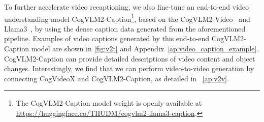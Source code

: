  
To further accelerate video recaptioning, we also fine-tune an end-to-end video understanding model CogVLM2-Caption\footnote{The CogVLM2-Caption model weight is openly available at 
\href{https://huggingface.co/THUDM/cogvlm2-llama3-caption}{https://huggingface.co/THUDM/cogvlm2-llama3-caption}.
}, based on the CogVLM2-Video~\citep{hong2024cogvlm2} and Llama3~\citep{llama3modelcard}, by using the dense caption data generated from the aforementioned pipeline. 
Examples of video captions generated by this end-to-end CogVLM2-Caption model are shown in \cref{fig:v2t} and Appendix~\ref{ap:video_caption_example}. CogVLM2-Caption can provide detailed descriptions of video content and object changes. Interestingly, we find that we can perform video-to-video generation by connecting CogVideoX and CogVLM2-Caption, as detailed in ~\cref{ap:v2v}.







